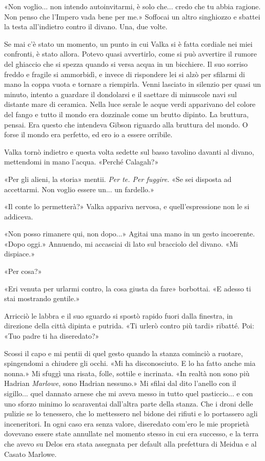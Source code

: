 «Non voglio... non intendo autoinvitarmi, è solo che... credo che tu
abbia ragione. Non penso che l'Impero vada bene per me.» Soffocai un
altro singhiozzo e sbattei la testa all'indietro contro il divano. Una,
due volte.

Se mai c'è stato un momento, un punto in cui Valka si è fatta cordiale
nei miei confronti, è stato allora. Potevo quasi avvertirlo, come si può
avvertire il rumore del ghiaccio che si spezza quando si versa acqua in
un bicchiere. Il suo sorriso freddo e fragile si ammorbidì, e invece di
rispondere lei si alzò per sfilarmi di mano la coppa vuota e tornare a
riempirla. Venni lasciato in silenzio per quasi un minuto, intento a
guardare il dondolarsi e il saettare di minuscole navi sul distante mare
di ceramica. Nella luce serale le acque verdi apparivano del colore del
fango e tutto il mondo era dozzinale come un brutto dipinto. La
bruttura, pensai. Era questo che intendeva Gibson riguardo alla bruttura
del mondo. O forse il mondo era perfetto, ed ero io a essere orribile.

Valka tornò indietro e questa volta sedette sul basso tavolino davanti
al divano, mettendomi in mano l'acqua. «Perché Calagah?»

«Per gli alieni, la storia» mentii. \emph{Per te. Per fuggire.} «Se sei
disposta ad accettarmi. Non voglio essere un... un fardello.»

«Il conte lo permetterà?» Valka appariva nervosa, e quell'espressione
non le si addiceva.

«Non posso rimanere qui, non dopo...» Agitai una mano in un gesto
incoerente. «Dopo oggi.» Annuendo, mi accasciai di lato sul bracciolo
del divano. «Mi dispiace.»

«Per cosa?»

«Eri venuta per urlarmi contro, la cosa giusta da fare» borbottai. «E
adesso ti stai mostrando gentile.»

Arricciò le labbra e il suo sguardo si spostò rapido fuori dalla
finestra, in direzione della città dipinta e putrida. «Ti urlerò contro
più tardi» ribatté. Poi: «Tuo padre ti ha diseredato?»

Scossi il capo e mi pentii di quel gesto quando la stanza cominciò a
ruotare, spingendomi a chiudere gli occhi. «Mi ha disconosciuto. E lo ha
fatto anche mia nonna.» Mi sfuggì una risata, folle, sottile e
incrinata. «In realtà non sono più Hadrian \emph{Marlowe}, sono Hadrian
nessuno.» Mi sfilai dal dito l'anello con il sigillo... quel dannato
arnese che mi aveva messo in tutto quel pasticcio... e con uno sforzo
minimo lo scaraventai dall'altra parte della stanza. Che i droni delle
pulizie se lo tenessero, che lo mettessero nel bidone dei rifiuti e lo
portassero agli inceneritori. In ogni caso era senza valore, diseredato
com'ero le mie proprietà dovevano essere state annullate nel momento
stesso in cui era successo, e la terra che avevo su Delos era stata
assegnata per default alla prefettura di Meidua e al Casato Marlowe.


